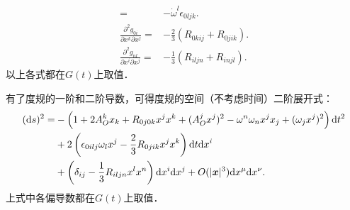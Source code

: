 \begin{subequations}
\begin{align}
    =& -\dot{\omega}^l \epsilon_{0ljk}  . \\
    \frac{\partial^2 g_{0i}}{\partial x^k \partial x^j}
    =&-\frac{2}{3}\left({R}_{0kij} +{R}_{0jik} \right) . \\
    \frac{\partial^2 g_{nl}}{\partial x^i\partial x^j}
    =& -\frac{1}{3}\left({R}_{iljn}+{R}_{injl} \right).
\end{align}
\end{subequations}
以上各式都在$G(t)$上取值．

有了度规的一阶和二阶导数，可得度规的空间（不考虑时间）二阶展开式：
\begin{align}
    ({\rm d}s)^2 =& -\left(1+2 A_O^k x_k
     + R_{0 j 0 k}x^j x^k + (A_{O}^jx^j)^2
      -  \omega^n \omega_n x^j x_j
      +  (\omega_jx^j)^2 \right) {\rm d}t^2  \notag \\
    &+2\left( \epsilon_{0ilj} \omega_l x^j
     -\frac{2}{3}{R}_{0jik} x^j x^k \right) {\rm d}t {\rm d}x^i  \notag \\
    &+\left( \delta_{ij} -\frac{1}{3}{R}_{iljn} x^l x^n
     \right) {\rm d}x^i {\rm d}x^j
    + O(|\boldsymbol{x}|^3){\rm d}x^\mu {\rm d}x^\nu .  \label{chfd:eqn_g-O2nd}
\end{align}
上式中各偏导数都在$G(t)$上取值．

